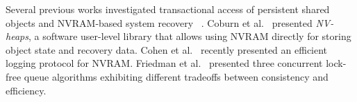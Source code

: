 Several previous works investigated transactional access
of persistent shared objects and NVRAM-based system recovery ~\cite{BoehmC-ISMM2016,KolliPSCW-Asplos2016,MaratheSBH-HotStorage2017,DBLP:conf/vldb/SchwalbDUP15,DBLP:conf/asplos/NarayananH12,VenkataramanTRC-FAST2011,VolosTS-Asplos2011}.
Coburn et al.~\cite{CoburnCAGGJW-Asplos2011} presented \emph{NV-heaps},
a software user-level library that allows using NVRAM directly
for storing object state and recovery data. Cohen et al.~\cite{DBLP:journals/pacmpl/CohenFL17} recently presented an efficient logging protocol for NVRAM.
Friedman et al.~\cite{Erez-et-al-DISC-17} presented three concurrent lock-free queue algorithms exhibiting different tradeoffs between consistency and efficiency. 




